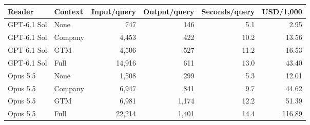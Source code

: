 \begin{tabular}{llrrrr}
\toprule
Reader & Context & Input/query & Output/query & Seconds/query & USD/1,000 \\
\midrule
GPT-6.1 Sol & None & 747 & 146 & 5.1 & 2.95 \\
GPT-6.1 Sol & Company & 4,453 & 422 & 10.2 & 13.56 \\
GPT-6.1 Sol & GTM & 4,506 & 527 & 11.2 & 16.53 \\
GPT-6.1 Sol & Full & 14,916 & 611 & 13.0 & 43.40 \\
\midrule
Opus 5.5 & None & 1,508 & 299 & 5.3 & 12.01 \\
Opus 5.5 & Company & 6,947 & 841 & 9.7 & 44.62 \\
Opus 5.5 & GTM & 6,981 & 1,174 & 12.2 & 51.39 \\
Opus 5.5 & Full & 22,214 & 1,401 & 14.4 & 116.89 \\
\bottomrule
\end{tabular}
